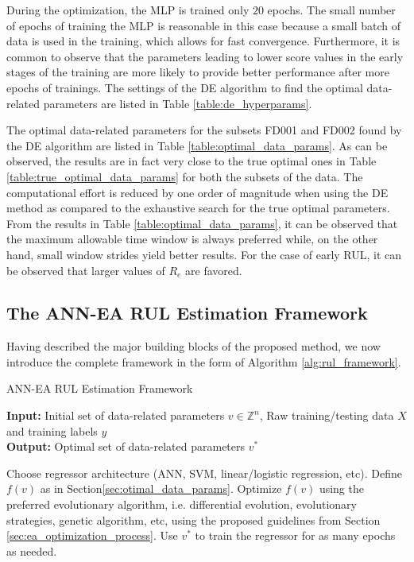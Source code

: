 \documentclass[12pt]{IEEEtran}%
\begin{document}
During the optimization, the MLP is trained only $20$ epochs. The small number
of epochs of training the MLP is reasonable in this case because a small batch
of data is used in the training, which allows for fast convergence.
Furthermore, it is common to observe that the parameters leading to lower
score values in the early stages of the training are more likely to provide
better performance after more epochs of trainings. The settings of
the DE algorithm to find the optimal data-related parameters are listed in
Table \ref{table:de_hyperparams}.

The optimal data-related parameters for the subsets FD001 and FD002 found by
the DE algorithm are listed in Table \ref{table:optimal_data_params}. As can be
observed, the results are in fact very close to the true optimal ones 
in Table \ref{table:true_optimal_data_params} for both the subsets of the
data. The computational effort is reduced by one order of magnitude when using
the DE method as compared to the exhaustive search for the true optimal
parameters. From the results in Table \ref{table:optimal_data_params}, it can
be observed that the maximum allowable time window is always preferred while,
on the other hand, small window strides yield better results. For the case of
early RUL, it can be observed that larger values of $R_{e}$ are favored.

\subsection{The ANN-EA RUL Estimation Framework}

Having described the major building blocks of the proposed method, we now
introduce the complete framework in the form of Algorithm \ref{alg:rul_framework}.

\setcounter{algorithm}{0} \begin{algorithm}[H]
\caption{ANN-EA RUL Estimation Framework}\label{alg:rul_framework}
\textbf{Input:} Initial set of data-related parameters $v \in \mathbb{Z}^n$, Raw training/testing data $X$ and training labels $y$\\
\textbf{Output:} Optimal set of data-related parameters $v^*$
\begin{algorithmic}[1]
\State Choose regressor architecture (ANN, SVM, linear/logistic regression, etc).
\State Define $f(v)$ as in Section\ref{sec:otimal_data_params}.
\State Optimize $f(v)$ using the preferred evolutionary algorithm, i.e. differential evolution, evolutionary strategies, genetic algorithm, etc, using the proposed guidelines from Section \ref{sec:ea_optimization_process}.
\State Use $v^*$ to train the regressor for as many epochs as needed.
\end{algorithmic}
\end{algorithm}
\end{document}
